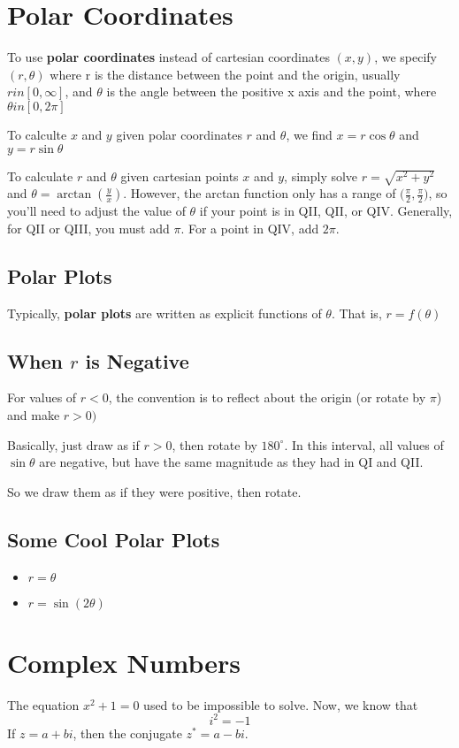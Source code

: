 \documentclass[12pt]{article}
\begin{document}
\section*{Polar Coordinates}
To use {\bf polar coordinates} instead of cartesian coordinates $(x,y)$, we specify $(r,\theta)$ where r is the distance between the point and the origin, usually $r in [0,\infty]$, and $\theta$ is the angle between the positive x axis and the point, where $\theta in [0,2\pi]$

To calculte $x$ and $y$ given polar coordinates $r$ and $\theta$, we find $x = r\cos\theta$ and $y = r\sin\theta$

To calculate $r$ and $\theta$ given cartesian points $x$ and $y$, simply solve $r = \sqrt{x^2 + y^2}$ and $\theta = \arctan(\frac{y}{x})$. However, the arctan function only has a range of $\bigl(\frac{\pi}{2},\frac{\pi}{2}\bigl)$, so you'll need to adjust the value of $\theta$ if your point is in QII, QII, or QIV. Generally, for QII or QIII, you must add $\pi$. For a point in QIV, add $2\pi$.

\subsection*{Polar Plots}
Typically, {\bf polar plots} are written as explicit functions of $\theta$. That is, $r = f(\theta)$

\subsection*{When $r$ is Negative}
For values of $r < 0$, the convention is to reflect about the origin (or rotate by $\pi$) and make $r > 0)$

Basically, just draw as if $r > 0$, then rotate by $180^\circ$. In this interval, all values of $\sin\theta$ are negative, but have the same magnitude as they had in QI and QII.

So we draw them as if they were positive, then rotate.

\subsection*{Some Cool Polar Plots}
\begin{itemize}
\item $r = \theta$
\item $r = \sin(2\theta)$
\end{itemize}

\section*{Complex Numbers}
The equation $x^2 + 1 = 0$ used to be impossible to solve. Now, we know that \[ i^2 = -1 \] If $z = a + bi$, then the conjugate $z^* = a - bi$.
\end{document}
